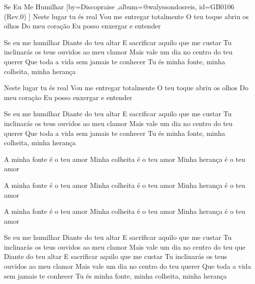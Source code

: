 \beginsong
{Se Eu Me Humilhar %
}[by={Discopraise %
},album={@walyssondosreis},
id={GB0106 %
(Rev.0) %
}]
Neste lugar tu és real
Vou me entregar totalmente
O teu toque abriu os olhos
Do meu coração
Eu posso enxergar e entender

Se eu me humilhar
Diante do teu altar
E sacrificar aquilo que me custar
Tu inclinarás os teus ouvidos ao meu clamor
Mais vale um dia no centro do teu querer
Que toda a vida sem jamais te conhecer
Tu és minha fonte, minha colheita, minha herança

Neste lugar tu és real
Vou me entregar totalmente
O teu toque abriu os olhos
Do meu coração
Eu posso enxergar e entender

Se eu me humilhar
Diante do teu altar
E sacrificar aquilo que me custar
Tu inclinarás os teus ouvidos ao meu clamor
Mais vale um dia no centro do teu querer
Que toda a vida sem jamais te conhecer
Tu és minha fonte, minha colheita, minha herança

A minha fonte é o teu amor
Minha colheita é o teu amor
Minha herança é o teu amor

A minha fonte é o teu amor
Minha colheita é o teu amor
Minha herança é o teu amor

A minha fonte é o teu amor
Minha colheita é o teu amor
Minha herança é o teu amor

Se eu me humilhar
Diante do teu altar
E sacrificar aquilo que me custar
Tu inclinarás os teus ouvidos ao meu clamor
Mais vale um dia no centro do teu que
Diante do teu altar
E sacrificar aquilo que me custar
Tu inclinarás os teus ouvidos ao meu clamor
Mais vale um dia no centro do teu querer
Que toda a vida sem jamais te conhecer
Tu és minha fonte, minha colheita, minha herança


